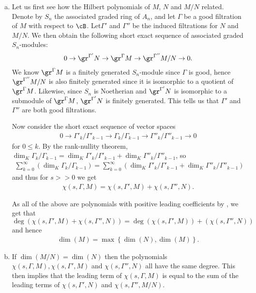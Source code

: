 \begin{prf}$ $
	\begin{enumerate}[(a)]
		\item Let us first see how the Hilbert polynomials of $M$, $N$ and $M/N$ related. Denote by $S_n$ the associated graded ring of $A_n$, and let $\Gamma$ be a good filtration of $M$ with respect to $\cB$. Let$\Gamma'$ and $\Gamma''$ be the induced filtrations for $N$ and $M/N$. We then obtain the following short exact sequence of associated graded $S_n$-modules:
		\begin{align*}
			0 \to \gr^{\Gamma'}N \to \gr^\Gamma M \to \gr^{\Gamma''}M/N \to 0.
		\end{align*}
		We know $\gr^\Gamma M$ is a finitely generated $S_n$-module since $\Gamma$ is good, hence $\gr^{\Gamma''}M/N$ is also finitely generated since it is isomorphic to a quotient of $\gr^\Gamma M$. Likewise, since $S_n$ is Noetherian and $\gr^{\Gamma'}N$ is isomorphic to a submodule of $\gr^\Gamma M$, $\gr^{\Gamma'}N$ is finitely generated. This tells us that $\Gamma'$ and $\Gamma''$ are both good filtrations.

		Now consider the short exact sequence of vector spaces
		\begin{align*}
			0 \to \Gamma'_k/\Gamma'_{k-1} \to \Gamma_k/\Gamma_{k-1} \to \Gamma''_{k}/\Gamma''_{k-1}\to 0
		\end{align*}
		for $0\leq k$. By the rank-nullity theorem, $\dim_K\Gamma_k/\Gamma_{k-1} = \dim_K\Gamma'_k/\Gamma'_{k-1} + \dim_K\Gamma''_{k}/\Gamma''_{k-1}$, so 
		\begin{align*}
			\sum_{k=0}^\infty\left(\dim_K\Gamma_k/\Gamma_{k-1}\right) = \sum_{k = 0}^\infty\left(\dim_K\Gamma'_k/\Gamma'_{k-1} + \dim_K\Gamma''_{k}/\Gamma''_{k-1}\right)
		\end{align*}
		and thus for $s >> 0$ we get
		\begin{align*}
			\chi(s,\Gamma,M) = \chi(s,\Gamma',M) + \chi(s,\Gamma'', N).
		\end{align*}

		As all of the above are polynomials with positive leading coefficients by , we get that $\deg\left(\chi(s,\Gamma',M) + \chi(s,\Gamma'', N)\right) = \deg\left(\chi(s,\Gamma',M)\right) + \left(\chi(s,\Gamma'', N)\right)$ and hence
		\begin{align*}
			\dim(M) = \max\left\{\dim(N), \dim(M)\right\}.
		\end{align*}
		\item If $\dim(M/N) = \dim(N)$ then the polynomials $\chi(s,\Gamma,M), \chi(s,\Gamma',M)$ and $\chi(s,\Gamma'', N)$ all have the same degree. This then implies that the leading term of $\chi(s,\Gamma, M)$ is equal to the sum of the leading terms of $\chi(s,\Gamma',N)$ and $\chi(s,\Gamma'',M/N)$.
	\end{enumerate}
\end{prf}
